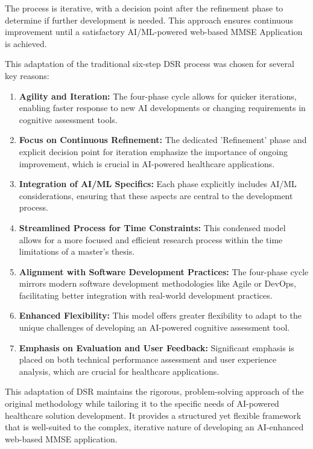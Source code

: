 The process is iterative, with a decision point after the refinement phase to determine if further development is needed. This approach ensures continuous improvement until a satisfactory AI/ML-powered web-based MMSE Application is achieved.

This adaptation of the traditional six-step DSR process was chosen for several key reasons:

\begin{enumerate}
    \item \textbf{Agility and Iteration:} The four-phase cycle allows for quicker iterations, enabling faster response to new AI developments or changing requirements in cognitive assessment tools.
    
    \item \textbf{Focus on Continuous Refinement:} The dedicated 'Refinement' phase and explicit decision point for iteration emphasize the importance of ongoing improvement, which is crucial in AI-powered healthcare applications.
    
    \item \textbf{Integration of AI/ML Specifics:} Each phase explicitly includes AI/ML considerations, ensuring that these aspects are central to the development process.
    
    \item \textbf{Streamlined Process for Time Constraints:} This condensed model allows for a more focused and efficient research process within the time limitations of a master's thesis.
    
    \item \textbf{Alignment with Software Development Practices:} The four-phase cycle mirrors modern software development methodologies like Agile or DevOps, facilitating better integration with real-world development practices.
    
    \item \textbf{Enhanced Flexibility:} This model offers greater flexibility to adapt to the unique challenges of developing an AI-powered cognitive assessment tool.
    
    \item \textbf{Emphasis on Evaluation and User Feedback:} Significant emphasis is placed on both technical performance assessment and user experience analysis, which are crucial for healthcare applications.
\end{enumerate}

This adaptation of DSR maintains the rigorous, problem-solving approach of the original methodology while tailoring it to the specific needs of AI-powered healthcare solution development. It provides a structured yet flexible framework that is well-suited to the complex, iterative nature of developing an AI-enhanced web-based MMSE application.

